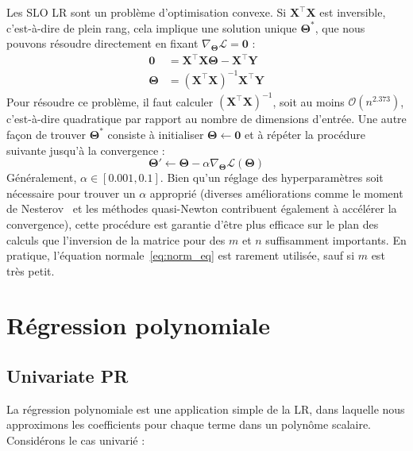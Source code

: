 {Les SLO LR sont un problème d'optimisation convexe. Si $\mathbf X^\intercal \mathbf X$ est inversible, c'est-à-dire de plein rang, cela implique une solution unique $\bm\Theta^*$, que nous pouvons résoudre directement en fixant $\nabla_{\bm\Theta}\mathcal{L} = \mathbf{0}$ :
%
\begin{align}\label{eq:norm_eq}
\mathbf{0} & = \mathbf X^\intercal \mathbf X \bm \Theta - \mathbf X ^ \intercal \mathbf Y \\ \bm\Theta &= (\mathbf X^\intercal \mathbf X)^{-1}\mathbf X^\intercal\mathbf Y
\end{align}
%
Pour résoudre ce problème, il faut calculer $(\mathbf{X}^\intercal\mathbf{X})^{-1}$, soit au moins $\mathcal{O}(n^{2.373})$\citep{williams2014multiplying}, c'est-à-dire quadratique par rapport au nombre de dimensions d'entrée. Une autre façon de trouver $\bm \Theta^*$ consiste à initialiser $\bm\Theta \leftarrow \mathbf{0}$ et à répéter la procédure suivante jusqu'à la convergence :
%
\begin{equation}
\bm\Theta' \leftarrow \bm\Theta - \alpha \nabla_{\bm\Theta}\mathcal L(\bm\Theta)
\end{equation}
%
Généralement, $\alpha \in [0.001, 0.1]$. Bien qu'un réglage des hyperparamètres soit nécessaire pour trouver un $\alpha$ approprié (diverses améliorations comme le moment de Nesterov~\citep{nesterov2013gradient} et les méthodes quasi-Newton contribuent également à accélérer la convergence), cette procédure est garantie d'être plus efficace sur le plan des calculs que l'inversion de la matrice pour des $m$ et $n$ suffisamment importants. En pratique, l'équation normale~\autoref{eq:norm_eq} est rarement utilisée, sauf si $m$ est très petit.

\section{Régression polynomiale}\label{sec:poly_reg}

\subsection{Univariate PR}

La régression polynomiale est une application simple de la LR, dans laquelle nous approximons les coefficients pour chaque terme dans un polynôme scalaire. Considérons le cas univarié :

}
